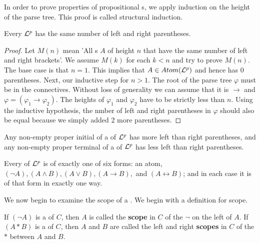 \documentclass[english, 11pt]{article}
\begin{document}
  In order to prove properties of propositional s, we apply induction on the height of the parse tree. This proof is called structural induction.

  \begin{lem}
    Every  $\mathcal{L}^p$ has the same number of left and right parentheses.
  \end{lem}

  \begin{proof}
    Let $M(n)$ mean 'All s $A$ of height $n$ that have the same number of left and right brackets'. We assume $M(k)$ for each $k<n$ and try to prove $M(n)$. The base case is that $n = 1$. This implies that $A \in Atom(\mathcal{L}^p)$ and hence has 0 parentheses. Next, our inductive step for $n > 1$. The root of the parse tree $\varphi$ must be in the connectives. Without loss of generality we can assume that it is $\rightarrow$ and $\varphi = (\varphi_1 \rightarrow \varphi_2)$. The heights of $\varphi_1$ and $\varphi_2$ have to be strictly less than $n$. Using the inductive hypothesis, the nmber of left and right parentheses in $\varphi$ should also be equal because we simply added 2 more parentheses.
  \end{proof}

  \begin{lem}
    Any non-empty proper initial of a  of $\mathcal{L}^p$ has more left than right parentheses, and any non-empty proper terminal  of a  of $\mathcal{L}^p$ has less left than right parentheses.
  \end{lem}

  \begin{thrm}
    Every  of $\mathcal{L}^p$ is of exactly one of six forms: an atom, $(\neg A), (A\land B), (A \lor B), (A \rightarrow B),$ and $(A \leftrightarrow B)$; and in each case it is of that form in exactly one way.
  \end{thrm}

  We now begin to examine the scope of a . We begin with a definition for scope.

  \begin{defn}[scope]
  \label{scope}
    If $(\neg A)$ is a  of $C$, then $A$ is called the \textbf{scope} in $C$ of the $\neg$ on the left of $A$. If $(A * B)$ is a  of $C$, then $A$ and $B$ are called the left and right \textbf{scopes} in $C$ of the $*$ between $A$ and $B$.
  \end{defn}
\end{document}
